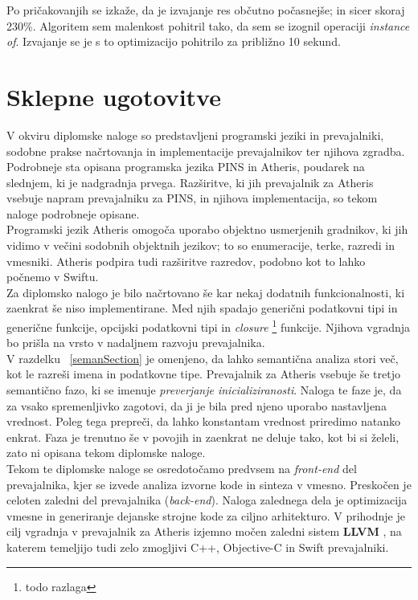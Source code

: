 \documentclass[a4paper, 12p]{book}
\begin{document}

Po pričakovanjih se izkaže, da je izvajanje res občutno počasnejše; in sicer skoraj 230\%. Algoritem sem malenkost pohitril tako, da sem se izognil operaciji \textit{instance of}. Izvajanje se je s to optimizacijo pohitrilo za približno 10 sekund.

\chapter{Sklepne ugotovitve}

V okviru diplomske naloge so predstavljeni programski jeziki in prevajalniki, sodobne prakse načrtovanja in implementacije prevajalnikov ter njihova zgradba. Podrobneje sta opisana programska jezika PINS in Atheris, poudarek na slednjem, ki je nadgradnja prvega. Razširitve, ki jih prevajalnik za Atheris vsebuje napram prevajalniku za PINS, in njihova implementacija, so tekom naloge podrobneje opisane. \\
\indent Programski jezik Atheris omogoča uporabo objektno usmerjenih gradnikov, ki jih vidimo v večini sodobnih objektnih jezikov; to so enumeracije, terke, razredi in vmesniki. Atheris podpira tudi razširitve razredov, podobno kot to lahko počnemo v Swiftu. \\
\indent Za diplomsko nalogo je bilo načrtovano še kar nekaj dodatnih funkcionalnosti, ki zaenkrat še niso implementirane. Med njih spadajo generični podatkovni tipi in generične funkcije, opcijski podatkovni tipi in \textit{closure} \footnote{todo razlaga} funkcije. Njihova vgradnja bo prišla na vrsto v nadaljnem razvoju prevajalnika. \\
\indent  V razdelku ~\ref{semanSection} je omenjeno, da lahko semantična analiza stori več, kot le razreši imena in podatkovne tipe. Prevajalnik za Atheris vsebuje še tretjo semantično fazo, ki se imenuje \textit{preverjanje inicializiranosti}. Naloga te faze je, da za vsako spremenljivko zagotovi, da ji je bila pred njeno uporabo nastavljena vrednost. Poleg tega prepreči, da lahko konstantam vrednost priredimo natanko enkrat. Faza je trenutno še v povojih in zaenkrat ne deluje tako, kot bi si želeli, zato ni opisana tekom diplomske naloge. \\
\indent Tekom te diplomske naloge se osredotočamo predvsem na \textit{front-end} del prevajalnika, kjer se izvede analiza izvorne kode in sinteza v vmesno. Preskočen je celoten zaledni del prevajalnika (\textit{back-end}). Naloga zalednega dela je optimizacija vmesne in generiranje dejanske strojne kode za ciljno arhitekturo. V prihodnje je cilj vgradnja v prevajalnik za Atheris izjemno močen zaledni sistem \textbf{LLVM} \cite{LLVM}, na katerem temeljijo tudi zelo zmogljivi C++, Objective-C in Swift prevajalniki.
\end{document}
